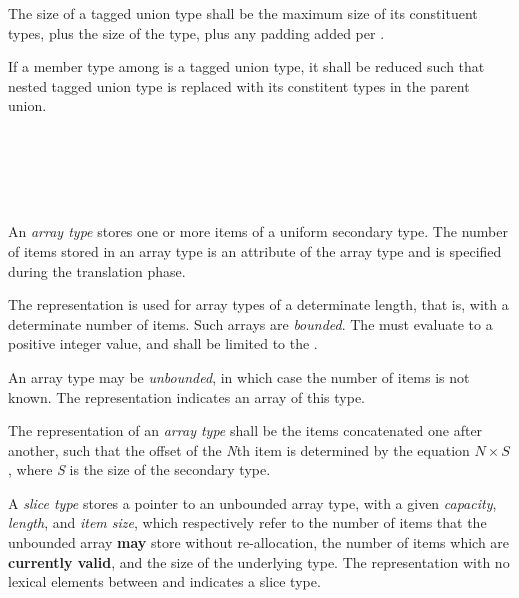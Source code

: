\specsubsubitem
The size of a tagged union type shall be the maximum size of its constituent
types, plus the size of the  type, plus any padding added per
.

\specsubsubitem
If a member type among  is a tagged union type, it
shall be reduced such that nested tagged union type is replaced with its
constitent types in the parent union.



\begin{grammar}
 \\
	\terminal{[} \terminal{]}  \\
	\terminal{[}  \terminal{]}  \\
	\terminal{[} \terminal{*} \terminal{]}  \\
\end{grammar}

\specsubsubitem
An \textit{array type} stores one or more items of a uniform secondary type.
The number of items stored in an array type is an attribute of the array type
and is specified during the translation phase.

\specsubsubitem
The  representation is used for array types of a
determinate length, that is, with a determinate number of items. Such arrays are
\textit{bounded}. The  must evaluate to a
positive integer value, and shall be limited to the .

\specsubsubitem
An array type may be \textit{unbounded}, in which case the number of items is
not known. The \terminal{*} representation indicates an array of this type.

\specsubsubitem
The representation of an \textit{array type} shall be the items concatenated one
after another, such that the offset of the \textit{N}th item is determined by
the equation $N \times S$, where \textit{S} is the size of the secondary type.

\specsubsubitem
A \textit{slice type} stores a pointer to an unbounded array type, with a given
\textit{capacity}, \textit{length}, and \textit{item size}, which respectively
refer to the number of items that the unbounded array \textbf{may} store without
re-allocation, the number of items which are \textbf{currently valid}, and the
size of the underlying type. The representation with no lexical elements between
\terminal{[} and \terminal{]} indicates a slice type.

